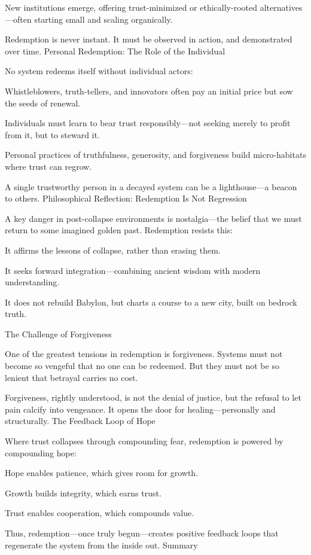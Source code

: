\documentclass[11pt,oneside]{book}
\begin{document}
    New institutions emerge, offering trust-minimized or ethically-rooted alternatives—often starting small and scaling organically.

Redemption is never instant. It must be observed in action, and demonstrated over time.
Personal Redemption: The Role of the Individual

No system redeems itself without individual actors:

    Whistleblowers, truth-tellers, and innovators often pay an initial price but sow the seeds of renewal.

    Individuals must learn to bear trust responsibly—not seeking merely to profit from it, but to steward it.

    Personal practices of truthfulness, generosity, and forgiveness build micro-habitats where trust can regrow.

A single trustworthy person in a decayed system can be a lighthouse—a beacon to others.
Philosophical Reflection: Redemption Is Not Regression

A key danger in post-collapse environments is nostalgia—the belief that we must return to some imagined golden past. Redemption resists this:

    It affirms the lessons of collapse, rather than erasing them.

    It seeks forward integration—combining ancient wisdom with modern understanding.

    It does not rebuild Babylon, but charts a course to a new city, built on bedrock truth.

The Challenge of Forgiveness

One of the greatest tensions in redemption is forgiveness. Systems must not become so vengeful that no one can be redeemed. But they must not be so lenient that betrayal carries no cost.

Forgiveness, rightly understood, is not the denial of justice, but the refusal to let pain calcify into vengeance. It opens the door for healing—personally and structurally.
The Feedback Loop of Hope

Where trust collapses through compounding fear, redemption is powered by compounding hope:

    Hope enables patience, which gives room for growth.

    Growth builds integrity, which earns trust.

    Trust enables cooperation, which compounds value.

Thus, redemption—once truly begun—creates positive feedback loops that regenerate the system from the inside out.
Summary
\end{document}
